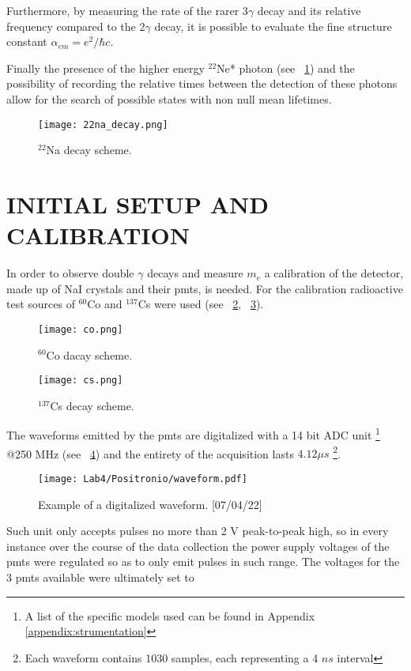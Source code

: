 \documentclass[10pt,a4paper,twocolumn]{article}
\begin{document}
Furthermore, by measuring the rate of the rarer 3$\gamma$ decay and its relative frequency compared to the 2$\gamma$ decay, it is possible to evaluate the fine structure constant $\alpha_{em}=e^2/\hbar c$.

Finally the presence of the higher energy $^{22}$Ne* photon (see \figurename~\ref{fig:22na}) and the possibility of recording the relative times between the detection of these photons allow for the search of possible states with non null mean lifetimes. 

\begin{figure}[h!]
\centering
\texttt{[image: 22na\_decay.png]} 
\caption{$^{22}$Na decay scheme.}
\label{fig:22na}
\end{figure}

\section{INITIAL SETUP AND CALIBRATION }


In order to observe double $\gamma$ decays and measure $m_e$ a calibration of the detector, made up of NaI crystals and their pmts, is needed. For the calibration radioactive test sources of $^{60}$Co and $^{137}$Cs were used (see \figurename~\ref{fig:60co}, \figurename~\ref{fig:137cs}). 

\begin{figure}[h!]
\centering
\texttt{[image: co.png]} 
\caption{$^{60}$Co dacay scheme.}
\label{fig:60co}
\end{figure}

\begin{figure}[h!]
\centering
\texttt{[image: cs.png]} 
\caption{$^{137}$Cs decay scheme.}
\label{fig:137cs}
\end{figure}

The waveforms emitted by the pmts are digitalized with a 14 bit ADC unit \footnote{A list of the specific models used can be found in Appendix \ref{appendix:strumentation}} @250 MHz (see \figurename~\ref{fig:wave}) and the entirety of the acquisition lasts $4.12 \mu s$ \footnote{Each waveform contains 1030 samples, each representing a 4 $ns$ interval}. 

\begin{figure}[h!]
\centering
\caption{Example of a digitalized waveform. [07/04/22]}
\texttt{[image: Lab4/Positronio/waveform.pdf]} 
\label{fig:wave}
\end{figure}

Such unit only accepts pulses no more than 2 V peak-to-peak high, so in every instance over the course of the data collection the power supply voltages of the pmts were regulated so as to only emit pulses in such range. The voltages for the 3 pmts available were ultimately set to 
\end{document}
